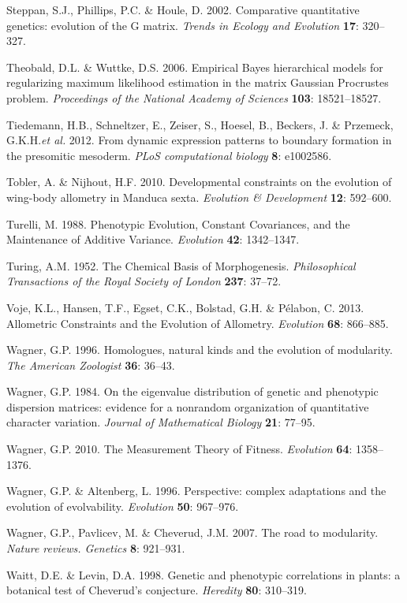 \documentclass[12pt,twoside]{report}
\begin{document}
Steppan, S.J., Phillips, P.C. \& Houle, D. 2002. Comparative
quantitative genetics: evolution of the G matrix. \emph{Trends in
Ecology and Evolution} \textbf{17}: 320--327.

Theobald, D.L. \& Wuttke, D.S. 2006. Empirical Bayes hierarchical models
for regularizing maximum likelihood estimation in the matrix Gaussian
Procrustes problem. \emph{Proceedings of the National Academy of
Sciences} \textbf{103}: 18521--18527.

Tiedemann, H.B., Schneltzer, E., Zeiser, S., Hoesel, B., Beckers, J. \&
Przemeck, G.K.H.\emph{et al.} 2012. From dynamic expression patterns to
boundary formation in the presomitic mesoderm. \emph{PLoS computational
biology} \textbf{8}: e1002586.

Tobler, A. \& Nijhout, H.F. 2010. Developmental constraints on the
evolution of wing-body allometry in Manduca sexta. \emph{Evolution \&
Development} \textbf{12}: 592--600.

Turelli, M. 1988. Phenotypic Evolution, Constant Covariances, and the
Maintenance of Additive Variance. \emph{Evolution} \textbf{42}:
1342--1347.

Turing, A.M. 1952. The Chemical Basis of Morphogenesis.
\emph{Philosophical Transactions of the Royal Society of London}
\textbf{237}: 37--72.

Voje, K.L., Hansen, T.F., Egset, C.K., Bolstad, G.H. \& Pélabon, C.
2013. Allometric Constraints and the Evolution of Allometry.
\emph{Evolution} \textbf{68}: 866--885.

Wagner, G.P. 1996. Homologues, natural kinds and the evolution of
modularity. \emph{The American Zoologist} \textbf{36}: 36--43.

Wagner, G.P. 1984. On the eigenvalue distribution of genetic and
phenotypic dispersion matrices: evidence for a nonrandom organization of
quantitative character variation. \emph{Journal of Mathematical Biology}
\textbf{21}: 77--95.

Wagner, G.P. 2010. The Measurement Theory of Fitness. \emph{Evolution}
\textbf{64}: 1358--1376.

Wagner, G.P. \& Altenberg, L. 1996. Perspective: complex adaptations and
the evolution of evolvability. \emph{Evolution} \textbf{50}: 967--976.

Wagner, G.P., Pavlicev, M. \& Cheverud, J.M. 2007. The road to
modularity. \emph{Nature reviews. Genetics} \textbf{8}: 921--931.

Waitt, D.E. \& Levin, D.A. 1998. Genetic and phenotypic correlations in
plants: a botanical test of Cheverud's conjecture. \emph{Heredity}
\textbf{80}: 310--319.
\end{document}
